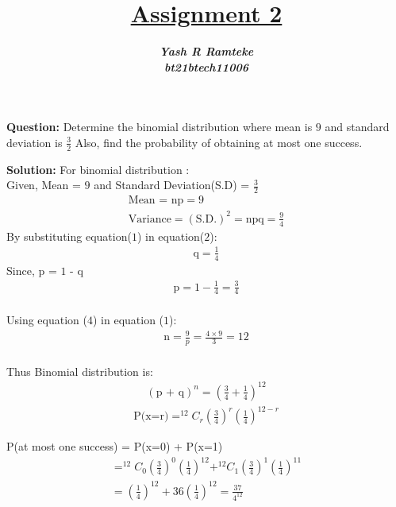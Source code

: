 \documentclass[journal,12pt,twocolumn]{IEEEtran}
\title{\textbf{\underline{Assignment 2}}}
\author{\textbf{\textit{Yash R Ramteke}}\\
\textbf{\textit{bt21btech11006}}}
\begin{document}
\maketitle

\textbf{Question:}
Determine the binomial distribution where mean is $9$ and standard deviation is $\frac{3}{2}$ Also, find the probability of obtaining at most one success.

\bigskip
\textbf{Solution:}
For binomial distribution :\\
Given, Mean = $9$ and Standard Deviation(S.D) = $\frac{3}{2}$
\begin{align}
    \text{Mean = np} = 9
    \\
    \text{Variance} = (\text{S.D.})^{2} = \text{npq} = \frac{9}{4}
\end{align}
By substituting equation($1$) in equation($2$):
\begin{align}
      \text{q} = \frac{1}{4}
\end{align}
Since, p = $1$ - q
\begin{align}
      \text{p} = 1 - \frac{1}{4} = \frac{3}{4} 
\end{align}\\
Using equation ($4$) in equation ($1$):
\begin{align}
      \text{n} = \frac{9}{p} = \frac{4\times9}{3} = 12
\end{align}\\
Thus Binomial distribution is:
\begin{align*}
   \left(\text{p + q}\right)^n =  \left(\frac{3}{4} + \frac{1}{4}\right)^{12}
\end{align*}
{}
\begin{align*}
\text{P(x=r)} = ^{12}C_r \left(\frac{3}{4}\right)^r \left(\frac{1}{4}\right)^{12-r}
\end{align*}

\begin{center}
\end{center}
P(at most one success) = P(x=0) + P(x=1)
\begin{align*}
= ^{12}C_0 \left({\frac{3}{4}}\right)^0 \left(\frac{1}{4}\right)^{12} + ^{12}C_1 \left(\frac{3}{4}\right)^1 \left(\frac{1}{4}\right)^{11} 
\\
= \left(\frac{1}{4}\right)^{12} + 36\left(\frac{1}{4}\right)^{12} =  \frac{37}{4^{12}}
\end{align*}
\end{document}
